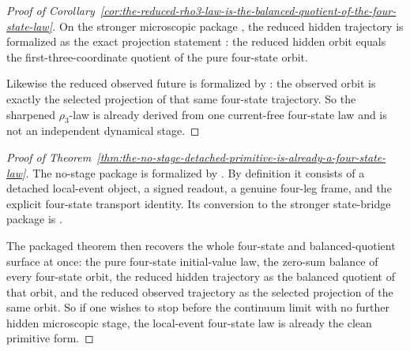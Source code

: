 \begin{proof}[Proof of Corollary~\ref{cor:the-reduced-rho3-law-is-the-balanced-quotient-of-the-four-state-law}]
\label{proof:cor:the-reduced-rho3-law-is-the-balanced-quotient-of-the-four-state-law}
On the stronger microscopic package
, the reduced hidden trajectory is
formalized as the exact projection statement
: the
reduced hidden orbit equals the first-three-coordinate quotient of the pure
four-state orbit.

Likewise the reduced observed future is formalized by
:
the observed orbit is exactly the selected projection of that same four-state
trajectory. So the sharpened \(\rho_3\)-law is already derived from one
current-free four-state law and is not an independent dynamical stage.
\end{proof}

\begin{proof}[Proof of Theorem~\ref{thm:the-no-stage-detached-primitive-is-already-a-four-state-law}]
\label{proof:thm:the-no-stage-detached-primitive-is-already-a-four-state-law}
The no-stage package is formalized by
. By definition it consists of a
detached local-event object, a signed readout, a genuine four-leg frame, and
the explicit four-state transport identity. Its conversion to the stronger
state-bridge package is
.

The packaged theorem  then
recovers the whole four-state and balanced-quotient surface at once: the pure
four-state initial-value law, the zero-sum balance of every four-state orbit,
the reduced hidden trajectory as the balanced quotient of that orbit, and the
reduced observed trajectory as the selected projection of the same orbit. So if
one wishes to stop before the continuum limit with no further hidden
microscopic stage, the local-event four-state law is already the clean
primitive form.
\end{proof}

